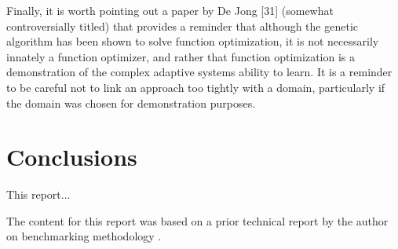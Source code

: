 \documentclass[a4paper, 11pt]{article}
\begin{document}
Finally, it is worth pointing out a paper by De Jong [31] (somewhat controversially titled) that provides a reminder that although the genetic algorithm has been shown to solve function optimization, it is not necessarily innately a function optimizer, and rather that function optimization is a demonstration of the complex adaptive systems ability to learn. It is a reminder to be careful not to link an approach too tightly with a domain, particularly if the domain was chosen for demonstration purposes.

\section{Conclusions}
\label{sec:conclusions}
This report...

The content for this report was based on a prior technical report by the author on benchmarking methodology \cite{Brownlee2007f}.



\end{document}
